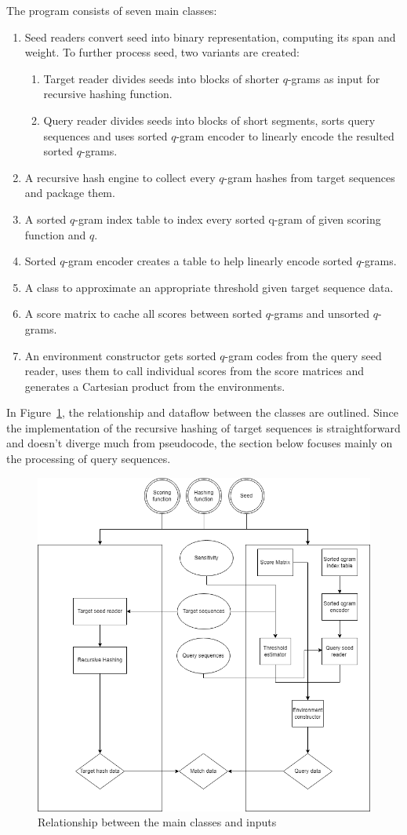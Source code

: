 The program consists of seven main classes:
\begin{enumerate}
    \item Seed readers convert seed into binary representation, computing its span and weight. To further process seed, two variants are created:
    \begin{enumerate}
        \item Target reader divides seeds into blocks of shorter \(q\)-grams as input for recursive hashing function.
        \item Query reader divides seeds into blocks of short segments, sorts query sequences and uses sorted \(q\)-gram encoder to linearly encode the resulted sorted \(q\)-grams.
    \end{enumerate}
    \item A recursive hash engine to collect every \(q\)-gram hashes from target sequences and package them.
    \item A sorted \(q\)-gram index table to index every sorted q-gram of given scoring function and \(q\).
    \item Sorted \(q\)-gram encoder creates a table to help linearly encode sorted \(q\)-grams.
    \item A class to approximate an appropriate threshold given target sequence data.
    \item A score matrix to cache all scores between sorted $q$-grams and unsorted $q$-grams.
    \item An environment constructor gets sorted \(q\)-gram codes from the query seed reader, uses them to call individual scores from the score matrices and generates a Cartesian product from the environments.
\end{enumerate}
In Figure~\ref{fig:classes}, the relationship and dataflow between the classes are outlined. Since the implementation of the recursive hashing of target sequences is straightforward and doesn't diverge much from pseudocode, the section below focuses mainly on the processing of query sequences.

\begin{figure}[t]
\begin{center}
\includegraphics[scale=0.5]{graphics/Class_Diagram.png}
\end{center}
\caption{Relationship between the main classes and inputs}
\label{fig:classes}
\end{figure}